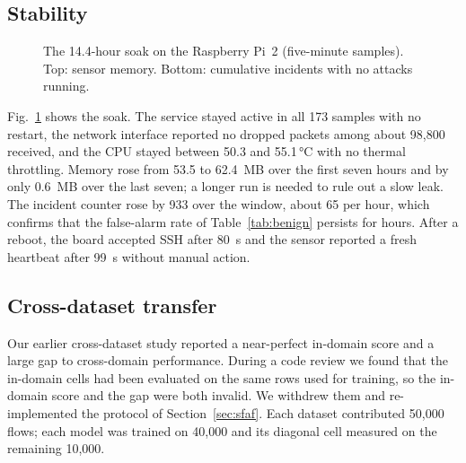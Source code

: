 \documentclass[conference]{IEEEtran}
\begin{document}
\subsection{Stability}

\begin{figure}[t]
\centering
{}
\caption{The 14.4-hour soak on the Raspberry Pi~2 (five-minute samples).
Top: sensor memory. Bottom: cumulative incidents with no attacks running.}
\label{fig:soak}
\end{figure}

Fig.~\ref{fig:soak} shows the soak. The service stayed active in all 173
samples with no restart, the network interface reported no dropped packets
among about 98{,}800 received, and the CPU stayed between 50.3 and
55.1\,\si{\celsius} with no thermal throttling. Memory rose from 53.5 to
62.4~MB over the first seven hours and by only 0.6~MB over the last seven;
a longer run is needed to rule out a slow leak. The incident counter rose by
933 over the window, about 65 per hour, which confirms that the false-alarm
rate of Table~\ref{tab:benign} persists for hours. After a reboot, the
board accepted SSH after 80~s and the sensor reported a fresh heartbeat
after 99~s without manual action.

\subsection{Cross-dataset transfer}

Our earlier cross-dataset study reported a near-perfect in-domain score and
a large gap to cross-domain performance. During a code review we found that
the in-domain cells had been evaluated on the same rows used for training,
so the in-domain score and the gap were both invalid. We withdrew them and
re-implemented the protocol of Section~\ref{sec:sfaf}. Each dataset
contributed 50{,}000 flows; each model was trained on 40{,}000 and its
diagonal cell measured on the remaining 10{,}000.
\end{document}
